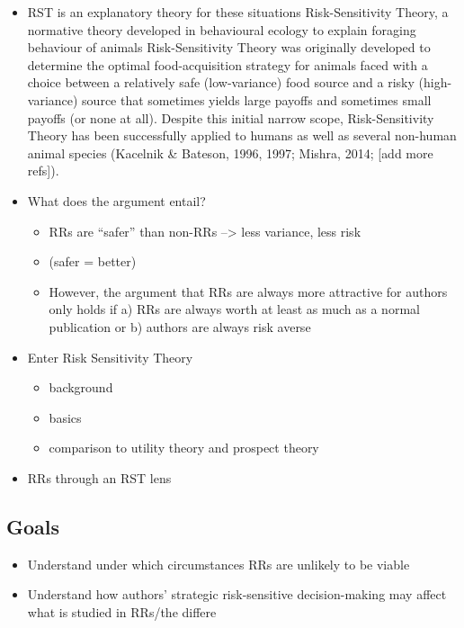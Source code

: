 \documentclass[british,,man,floatsintext]{apa6}
\providecommand{\tightlist}{%
  \setlength{\itemsep}{0pt}\setlength{\parskip}{0pt}}
\begin{document}
\begin{itemize}
\item
  RST is an explanatory theory for these situations
  Risk-Sensitivity Theory, a normative theory developed in behavioural ecology to explain foraging behaviour of animals
  Risk-Sensitivity Theory was originally developed to determine the optimal food-acquisition strategy for animals faced with a choice between a relatively safe (low-variance) food source and a risky (high-variance) source that sometimes yields large payoffs and sometimes small payoffs (or none at all).
  Despite this initial narrow scope, Risk-Sensitivity Theory has been successfully applied to humans as well as several non-human animal species (Kacelnik \& Bateson, 1996, 1997; Mishra, 2014; {[}add more refs{]}).
\item
  What does the argument entail?

  \begin{itemize}
  \tightlist
  \item
    RRs are \enquote{safer} than non-RRs --\textgreater{} less variance, less risk
  \item
    (safer = better)
  \item
    However, the argument that RRs are always more attractive for authors only holds if a) RRs are always worth at least as much as a normal publication or b) authors are always risk averse
  \end{itemize}
\item
  Enter Risk Sensitivity Theory

  \begin{itemize}
  \tightlist
  \item
    background
  \item
    basics
  \item
    comparison to utility theory and prospect theory
  \end{itemize}
\item
  RRs through an RST lens
\end{itemize}

\hypertarget{goals}{%
\subsection{Goals}\label{goals}}

\begin{itemize}
\tightlist
\item
  Understand under which circumstances RRs are unlikely to be viable
\item
  Understand how authors' strategic risk-sensitive decision-making may affect what is studied in RRs/the differe
\end{itemize}
\end{document}
